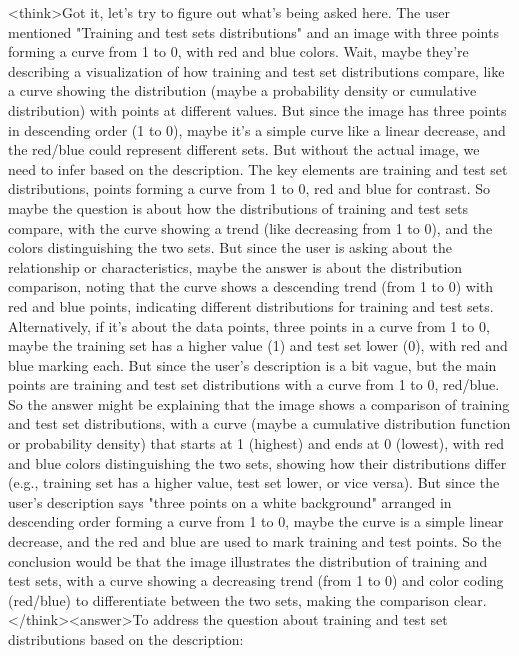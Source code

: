 <think>Got it, let's try to figure out what's being asked here. The user mentioned "Training and test sets distributions" and an image with three points forming a curve from 1 to 0, with red and blue colors. Wait, maybe they're describing a visualization of how training and test set distributions compare, like a curve showing the distribution (maybe a probability density or cumulative distribution) with points at different values. But since the image has three points in descending order (1 to 0), maybe it's a simple curve like a linear decrease, and the red/blue could represent different sets. But without the actual image, we need to infer based on the description. The key elements are training and test set distributions, points forming a curve from 1 to 0, red and blue for contrast. So maybe the question is about how the distributions of training and test sets compare, with the curve showing a trend (like decreasing from 1 to 0), and the colors distinguishing the two sets. But since the user is asking about the relationship or characteristics, maybe the answer is about the distribution comparison, noting that the curve shows a descending trend (from 1 to 0) with red and blue points, indicating different distributions for training and test sets. Alternatively, if it's about the data points, three points in a curve from 1 to 0, maybe the training set has a higher value (1) and test set lower (0), with red and blue marking each. But since the user's description is a bit vague, but the main points are training and test set distributions with a curve from 1 to 0, red/blue. So the answer might be explaining that the image shows a comparison of training and test set distributions, with a curve (maybe a cumulative distribution function or probability density) that starts at 1 (highest) and ends at 0 (lowest), with red and blue colors distinguishing the two sets, showing how their distributions differ (e.g., training set has a higher value, test set lower, or vice versa). But since the user's description says "three points on a white background" arranged in descending order forming a curve from 1 to 0, maybe the curve is a simple linear decrease, and the red and blue are used to mark training and test points. So the conclusion would be that the image illustrates the distribution of training and test sets, with a curve showing a decreasing trend (from 1 to 0) and color coding (red/blue) to differentiate between the two sets, making the comparison clear.</think><answer>To address the question about training and test set distributions based on the description:  


